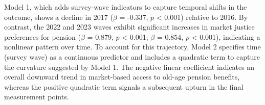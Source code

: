 \documentclass[
  12pt,
]{article}
\begin{document}
Model 1, which adds survey-wave indicators to capture temporal shifts in
the outcome, shows a decline in 2017 (\(\beta\) = -0.337, \(p\)
\textless{} 0.001) relative to 2016. By contrast, the 2022 and 2023
waves exhibit significant increases in market justice preferences for
pension (\(\beta\) = 0.879, \(p\) \textless{} 0.001; \(\beta\) = 0.854,
\(p\) \textless{} 0.001), indicating a nonlinear pattern over time. To
account for this trajectory, Model 2 specifies time (survey wave) as a
continuous predictor and includes a quadratic term to capture the
curvature suggested by Model 1. The negative linear coefficient
indicates an overall downward trend in market-based access to old-age
pension benefits, whereas the positive quadratic term signals a
subsequent upturn in the final measurement points.

\begin{table}

\caption{\label{tbl-modelos}Cumulative link longitudinal multilevel
models for pension market justice preferences}

\centering{

}
\end{table}
\end{document}
